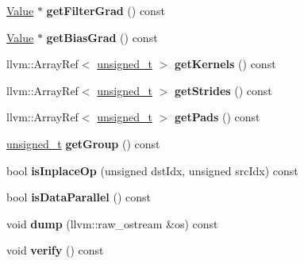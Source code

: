 \begin{DoxyCompactItemize}
\hyperlink{classglow_1_1_value}{Value} $\ast$ {\bfseries get\+Filter\+Grad} () const
\item 
\mbox{\label{classglow_1_1_convolution3_d_grad_inst_a60944468f078910c77a107efd384e3b4}} 
\hyperlink{classglow_1_1_value}{Value} $\ast$ {\bfseries get\+Bias\+Grad} () const
\item 
\mbox{\label{classglow_1_1_convolution3_d_grad_inst_a469f49c19da68f996dc64ff87cd488e0}} 
llvm\+::\+Array\+Ref$<$ \hyperlink{namespaceglow_a0ca574644e1e42ef193a9947fb4d8911}{unsigned\+\_\+t} $>$ {\bfseries get\+Kernels} () const
\item 
\mbox{\label{classglow_1_1_convolution3_d_grad_inst_ab11e561fd41b35cc624b95046a7621cc}} 
llvm\+::\+Array\+Ref$<$ \hyperlink{namespaceglow_a0ca574644e1e42ef193a9947fb4d8911}{unsigned\+\_\+t} $>$ {\bfseries get\+Strides} () const
\item 
\mbox{\label{classglow_1_1_convolution3_d_grad_inst_a2510a919b9a26b8aa30a9d390975c99a}} 
llvm\+::\+Array\+Ref$<$ \hyperlink{namespaceglow_a0ca574644e1e42ef193a9947fb4d8911}{unsigned\+\_\+t} $>$ {\bfseries get\+Pads} () const
\item 
\mbox{\label{classglow_1_1_convolution3_d_grad_inst_a079f8435808489488c2d1a5e3d4e042d}} 
\hyperlink{namespaceglow_a0ca574644e1e42ef193a9947fb4d8911}{unsigned\+\_\+t} {\bfseries get\+Group} () const
\item 
\mbox{\label{classglow_1_1_convolution3_d_grad_inst_a054406f79ea8ef4bb93559ff47d0ed92}} 
bool {\bfseries is\+Inplace\+Op} (unsigned dst\+Idx, unsigned src\+Idx) const
\item 
\mbox{\label{classglow_1_1_convolution3_d_grad_inst_a709f2be56d27cb4e5e03faf293f9dcaf}} 
bool {\bfseries is\+Data\+Parallel} () const
\item 
\mbox{\label{classglow_1_1_convolution3_d_grad_inst_a6a4a4c7e191b734fd9ad84b90a58d4e1}} 
void {\bfseries dump} (llvm\+::raw\+\_\+ostream \&os) const
\item 
\mbox{\label{classglow_1_1_convolution3_d_grad_inst_a5bf8732ff06720db5d41be3d55158d86}} 
void {\bfseries verify} () const
\end{DoxyCompactItemize}
